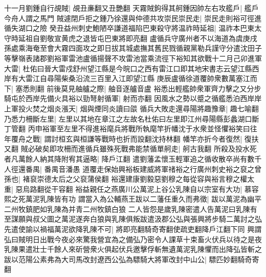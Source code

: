 十一月劉鍾自行覘賊|{
	覘丑亷翻又丑艷翻}
天霧賊鉤得其舸鍾因帥左右攻艦戶|{
	艦戶今舟人謂之馬門}
賊遽閉戶拒之鍾乃徐還與仲德共攻崇民崇民走|{
	崇民走則裕可徑進循失湖口之險}
癸丑益州刺史鮑陋卒謙道福陷巴東殺守將温祚時延祖|{
	温祚本巴東太守時延祖自劉敬宣黄虎之退皆屯巴東將即亮翻}
盧循兵守廣州者不以海道為虞庚戌孫處乘海奄至會大霧四面攻之即日拔其城處撫其舊民戮循親黨勒兵謹守分遣沈田子等擊嶺表諸郡劉裕軍雷池盧循揚聲不攻雷池當乘流徑下裕知其欲戰十二月己卯進軍大雷|{
	杜佑曰晉大雷戍舒州望江縣是今晥口之西有雷江口即其地宋書志云望江縣西岸有大雷江自尋陽柴桑沿流三百里入江即望江縣}
庚辰盧循徐道覆帥衆數萬塞江而下|{
	塞悉則翻}
前後莫見舳艫之際|{
	舳音逐艫音盧}
裕悉出輕艦帥衆軍齊力擊之又分步騎屯於西岸先備火具裕以勁弩射循軍|{
	射而亦翻}
因風水之勢以蹙之循艦悉泊西岸岸上軍投火焚之烟炎漲天|{
	烟與煙同炎讀曰燄}
循兵大敗走還尋陽將趣豫章|{
	趣七喻翻}
乃悉力柵斷左里|{
	左里以其地在章江之左故名杜佑曰左里即江州尋陽縣彭蠡湖口斷丁管翻}
丙申裕軍至左里不得進裕麾兵將戰所執麾竿折幡沈于水衆並怪懼裕笑曰往年覆舟之戰|{
	謂討桓玄與桓謙等戰時也折而設翻沈持林翻}
幡竿亦折今者復然|{
	復扶又翻}
賊必破矣即攻柵而進循兵雖殊死戰弗能禁循單舸走|{
	舸古我翻}
所殺及投水死者凡萬餘人納其降附宥其逼略|{
	降戶江翻}
遣劉藩孟懷玉輕軍追之循收散卒尚有數千人徑還番禺|{
	番禺音潘愚}
道覆走保始興裕板建威將軍禇裕之行廣州刺史裕之裒之曾孫也|{
	褚裒崇德太后之父裒蒲侯翻}
裕還建康劉毅惡劉穆之每從容與裕言穆之權太重|{
	惡烏路翻從干容翻}
裕益親任之燕廣川公萬泥上谷公乳陳自以宗室有大功|{
	慕容熙之死萬泥乳陳皆有功}
謂當入為公輔燕王跋以二藩任重久而弗徵|{
	跋以萬泥為幽平二州牧鎮肥如乳陳為并青二州牧鎮白狼}
二人皆怨是歲乳陳密遣人告萬泥曰乳陳有至謀願與叔父圖之萬泥遂奔白狼與乳陳俱叛跋遣汲郡公弘與張興將步騎二萬討之弘先遣使諭以禍福萬泥欲降乳陳不可|{
	將即亮翻騎奇寄翻使疏吏翻降戶江翻下同}
興謂弘曰賊明日出戰今夜必來驚我營宜為之備弘乃密令人課草十束畜火伏兵以待之是夜乳陳果遣壯士千餘人來斫營衆火俱起伏兵邀擊俘斬無遺萬泥乳陳懼而出降弘皆斬之跋以范陽公素弗為大司馬改封遼西公弘為驃騎大將軍改封中山公|{
	驃匹妙翻騎奇寄翻}


